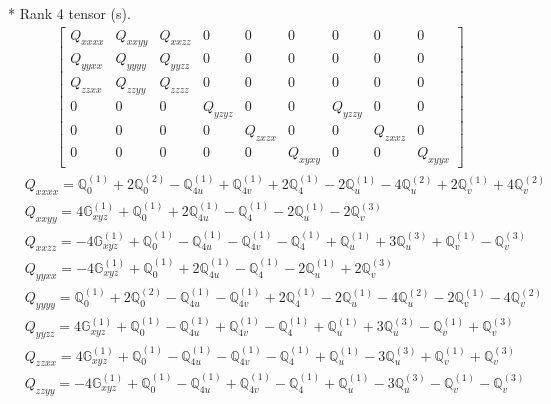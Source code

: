 \documentclass[fleqn,8pt,landscape]{jsarticle}
\begin{document}
* Rank 4 tensor (s).
\begin{align*}
\begin{bmatrix} Q_{xxxx} & Q_{xxyy} & Q_{xxzz} & 0 & 0 & 0 & 0 & 0 & 0 \\ Q_{yyxx} & Q_{yyyy} & Q_{yyzz} & 0 & 0 & 0 & 0 & 0 & 0 \\ Q_{zzxx} & Q_{zzyy} & Q_{zzzz} & 0 & 0 & 0 & 0 & 0 & 0 \\ 0 & 0 & 0 & Q_{yzyz} & 0 & 0 & Q_{yzzy} & 0 & 0 \\ 0 & 0 & 0 & 0 & Q_{zxzx} & 0 & 0 & Q_{zxxz} & 0 \\ 0 & 0 & 0 & 0 & 0 & Q_{xyxy} & 0 & 0 & Q_{xyyx} \end{bmatrix}
\end{align*}
\begin{align*}
& Q_{xxxx} = \mathbb{Q}_{0}^{(1)} + 2 \mathbb{Q}_{0}^{(2)} - \mathbb{Q}_{4u}^{(1)} + \mathbb{Q}_{4v}^{(1)} + 2 \mathbb{Q}_{4}^{(1)} - 2 \mathbb{Q}_{u}^{(1)} - 4 \mathbb{Q}_{u}^{(2)} + 2 \mathbb{Q}_{v}^{(1)} + 4 \mathbb{Q}_{v}^{(2)} \\
& Q_{xxyy} = 4 \mathbb{G}_{xyz}^{(1)} + \mathbb{Q}_{0}^{(1)} + 2 \mathbb{Q}_{4u}^{(1)} - \mathbb{Q}_{4}^{(1)} - 2 \mathbb{Q}_{u}^{(1)} - 2 \mathbb{Q}_{v}^{(3)} \\
& Q_{xxzz} = - 4 \mathbb{G}_{xyz}^{(1)} + \mathbb{Q}_{0}^{(1)} - \mathbb{Q}_{4u}^{(1)} - \mathbb{Q}_{4v}^{(1)} - \mathbb{Q}_{4}^{(1)} + \mathbb{Q}_{u}^{(1)} + 3 \mathbb{Q}_{u}^{(3)} + \mathbb{Q}_{v}^{(1)} - \mathbb{Q}_{v}^{(3)} \\
& Q_{yyxx} = - 4 \mathbb{G}_{xyz}^{(1)} + \mathbb{Q}_{0}^{(1)} + 2 \mathbb{Q}_{4u}^{(1)} - \mathbb{Q}_{4}^{(1)} - 2 \mathbb{Q}_{u}^{(1)} + 2 \mathbb{Q}_{v}^{(3)} \\
& Q_{yyyy} = \mathbb{Q}_{0}^{(1)} + 2 \mathbb{Q}_{0}^{(2)} - \mathbb{Q}_{4u}^{(1)} - \mathbb{Q}_{4v}^{(1)} + 2 \mathbb{Q}_{4}^{(1)} - 2 \mathbb{Q}_{u}^{(1)} - 4 \mathbb{Q}_{u}^{(2)} - 2 \mathbb{Q}_{v}^{(1)} - 4 \mathbb{Q}_{v}^{(2)} \\
& Q_{yyzz} = 4 \mathbb{G}_{xyz}^{(1)} + \mathbb{Q}_{0}^{(1)} - \mathbb{Q}_{4u}^{(1)} + \mathbb{Q}_{4v}^{(1)} - \mathbb{Q}_{4}^{(1)} + \mathbb{Q}_{u}^{(1)} + 3 \mathbb{Q}_{u}^{(3)} - \mathbb{Q}_{v}^{(1)} + \mathbb{Q}_{v}^{(3)} \\
& Q_{zzxx} = 4 \mathbb{G}_{xyz}^{(1)} + \mathbb{Q}_{0}^{(1)} - \mathbb{Q}_{4u}^{(1)} - \mathbb{Q}_{4v}^{(1)} - \mathbb{Q}_{4}^{(1)} + \mathbb{Q}_{u}^{(1)} - 3 \mathbb{Q}_{u}^{(3)} + \mathbb{Q}_{v}^{(1)} + \mathbb{Q}_{v}^{(3)} \\
& Q_{zzyy} = - 4 \mathbb{G}_{xyz}^{(1)} + \mathbb{Q}_{0}^{(1)} - \mathbb{Q}_{4u}^{(1)} + \mathbb{Q}_{4v}^{(1)} - \mathbb{Q}_{4}^{(1)} + \mathbb{Q}_{u}^{(1)} - 3 \mathbb{Q}_{u}^{(3)} - \mathbb{Q}_{v}^{(1)} - \mathbb{Q}_{v}^{(3)} \\

\end{align*}
\end{document}
